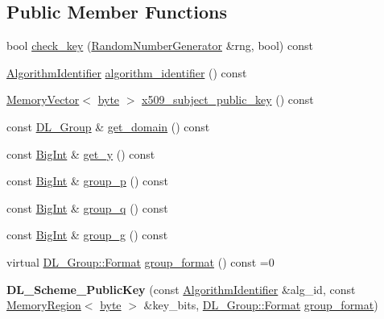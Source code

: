 \subsection*{Public Member Functions}
\begin{DoxyCompactItemize}
\item 
bool \hyperlink{classBotan_1_1DL__Scheme__PublicKey_a606c7805b7b974f72ee39cc3f57bcb39}{check\-\_\-key} (\hyperlink{classBotan_1_1RandomNumberGenerator}{Random\-Number\-Generator} \&rng, bool) const 
\item 
\hyperlink{classBotan_1_1AlgorithmIdentifier}{Algorithm\-Identifier} \hyperlink{classBotan_1_1DL__Scheme__PublicKey_a22ea083040ddd700bc802df342d323bb}{algorithm\-\_\-identifier} () const 
\item 
\hyperlink{classBotan_1_1MemoryVector}{Memory\-Vector}$<$ \hyperlink{namespaceBotan_a7d793989d801281df48c6b19616b8b84}{byte} $>$ \hyperlink{classBotan_1_1DL__Scheme__PublicKey_a80e06238a45ca3b04f1f67d0db6e9269}{x509\-\_\-subject\-\_\-public\-\_\-key} () const 
\item 
const \hyperlink{classBotan_1_1DL__Group}{D\-L\-\_\-\-Group} \& \hyperlink{classBotan_1_1DL__Scheme__PublicKey_a328a73cbfcf4b9faffeedcd14f676840}{get\-\_\-domain} () const 
\item 
const \hyperlink{classBotan_1_1BigInt}{Big\-Int} \& \hyperlink{classBotan_1_1DL__Scheme__PublicKey_ad8b65b34e6faedc94a2246d4ba23f6ea}{get\-\_\-y} () const 
\item 
const \hyperlink{classBotan_1_1BigInt}{Big\-Int} \& \hyperlink{classBotan_1_1DL__Scheme__PublicKey_a21b975521162f680659d522434cc3508}{group\-\_\-p} () const 
\item 
const \hyperlink{classBotan_1_1BigInt}{Big\-Int} \& \hyperlink{classBotan_1_1DL__Scheme__PublicKey_ab424c5d9a84911438317b6af68f3967b}{group\-\_\-q} () const 
\item 
const \hyperlink{classBotan_1_1BigInt}{Big\-Int} \& \hyperlink{classBotan_1_1DL__Scheme__PublicKey_a7fe29418515d6ca833d0f44f5e1dc696}{group\-\_\-g} () const 
\item 
virtual \hyperlink{classBotan_1_1DL__Group_ac602a30420ceec03fa181a10b09312a7}{D\-L\-\_\-\-Group\-::\-Format} \hyperlink{classBotan_1_1DL__Scheme__PublicKey_adf0844f45b1a8ed790ad2b15f1ea4040}{group\-\_\-format} () const =0
\item 
\hypertarget{classBotan_1_1DL__Scheme__PublicKey_a3533ebdc64cb9abcd638fda1170fa345}{{\bfseries D\-L\-\_\-\-Scheme\-\_\-\-Public\-Key} (const \hyperlink{classBotan_1_1AlgorithmIdentifier}{Algorithm\-Identifier} \&alg\-\_\-id, const \hyperlink{classBotan_1_1MemoryRegion}{Memory\-Region}$<$ \hyperlink{namespaceBotan_a7d793989d801281df48c6b19616b8b84}{byte} $>$ \&key\-\_\-bits, \hyperlink{classBotan_1_1DL__Group_ac602a30420ceec03fa181a10b09312a7}{D\-L\-\_\-\-Group\-::\-Format} \hyperlink{classBotan_1_1DL__Scheme__PublicKey_adf0844f45b1a8ed790ad2b15f1ea4040}{group\-\_\-format})}\label{classBotan_1_1DL__Scheme__PublicKey_a3533ebdc64cb9abcd638fda1170fa345}

\end{DoxyCompactItemize}

